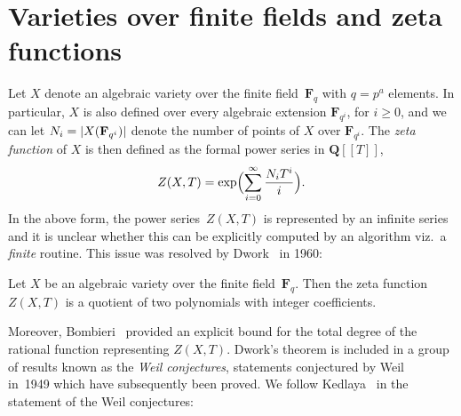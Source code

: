 

\section{Varieties over finite fields and zeta functions}

Let $X$ denote an algebraic variety over the finite field~$\mathbf{F}_q$ 
with $q = p^a$ elements.  In particular, $X$ is also defined 
over every algebraic extension $\mathbf{F}_{q^i}$, for $i \geq 0$, 
and we can let $N_i = \lvert X(\mathbf{F}_{q^i}) \rvert$ denote the number 
of points of $X$ over $\mathbf{F}_{q^i}$.  The \emph{zeta function} 
of $X$ is then defined as the formal power series in $\mathbf{Q}[[T]]$,
\begin{equation*}
Z(X, T) = \exp \Bigl( \sum_{i=0}^{\infty} \frac{N_i T^i}{i} \Bigr).
\end{equation*}
In the above form, the power series~$Z(X, T)$ is represented by an 
infinite series and it is unclear whether this can be explicitly 
computed by an algorithm viz.\ a \emph{finite} routine.  This issue 
was resolved by Dwork~\citep{Dwork1960} in 1960:

\begin{thm}
Let $X$ be an algebraic variety over the finite field~$\mathbf{F}_q$.  
Then the zeta function $Z(X, T)$ is a quotient of two polynomials with 
integer coefficients.
\end{thm}

Moreover, Bombieri~\citep{Bombieri1978} provided an explicit bound 
for the total degree of the rational function representing $Z(X, T)$.
Dwork's theorem is included in a group of results known as the 
\emph{Weil conjectures}, statements conjectured by Weil~\citep{Weil1949} 
in~1949 which have subsequently been proved.  We follow 
Kedlaya~\citep[Theorem~1.2.1]{Kedlaya2011} in the statement of the Weil 
conjectures:

